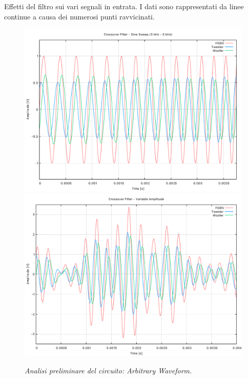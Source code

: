 \documentclass{beamer}
\begin{document}
\begin{frame}
    Effetti del filtro sui vari segnali in entrata. I dati sono rappresentati da linee continue a causa dei numerosi punti ravvicinati.
    \begin{figure}
        \includegraphics[width=0.45\linewidth]{../results/CFSineSweep.pdf}
        \includegraphics[width=0.45\linewidth]{../results/CFAmplitudeMod.pdf}
        \caption{\textit{Analisi preliminare del circuito: Arbitrary Waveform.}}
    \end{figure}
\end{frame}
\end{document}

